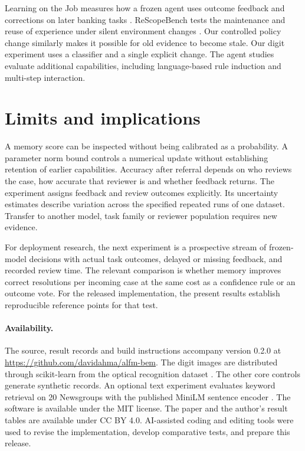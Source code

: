 \documentclass[11pt,letterpaper]{article}
\begin{document}
Learning on the Job measures how a frozen agent uses outcome feedback and
corrections on later banking tasks \citep{job}. ReScopeBench tests the
maintenance and reuse of experience under silent environment changes
\citep{rescope}. Our controlled policy change similarly makes it possible
for old evidence to become stale. Our digit experiment uses a classifier and
a single explicit change. The agent studies evaluate additional capabilities,
including language-based rule induction and multi-step interaction.

\section{Limits and implications}
A memory score can be inspected without being calibrated as a probability.
A parameter norm bound controls a numerical update without establishing retention
of earlier capabilities. Accuracy after referral depends on who reviews the
case, how accurate that reviewer is and whether feedback returns. The experiment
assigns feedback and review outcomes explicitly. Its uncertainty estimates
describe variation across the specified repeated runs of one dataset.
Transfer to another model, task family or reviewer population requires new
evidence.

For deployment research, the next experiment is a prospective stream of
frozen-model decisions with actual task outcomes, delayed or missing feedback,
and recorded review time. The relevant comparison is whether memory
improves correct resolutions per incoming case at the same cost as a
confidence rule or an outcome vote. For the released implementation,
the present results establish reproducible reference points for that test.

\paragraph{Availability.}
The source, result records and build instructions accompany version 0.2.0 at
\url{https://github.com/davidahma/alfm-bem}. The digit images are distributed
through scikit-learn \citep{sklearn} from the optical recognition dataset
\citep{digits}. The other core controls generate synthetic records. An
optional text experiment evaluates keyword retrieval on 20 Newsgroups with
the published MiniLM sentence encoder \citep{newsgroups,minilm}.
The software is available under the MIT license. The paper and the author's
result tables are available under CC BY 4.0. AI-assisted coding and editing
tools were used to revise the implementation, develop comparative tests,
and prepare this release.



\appendix



\end{document}
